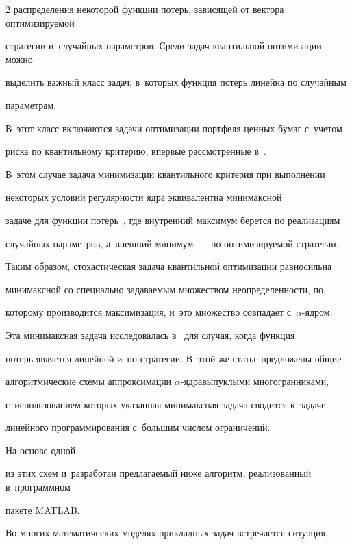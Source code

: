 \begin{multicols}{2}
распределения некоторой функции потерь, зависящей от вектора оптимизируемой 

стратегии и~случайных па\-ра\-мет\-ров. Среди задач квантильной оптимизации можно

 выделить важный класс задач, в~которых функция потерь линейна по случайным 

 па\-ра\-мет\-рам.

В~этот класс включаются задачи оптимизации портфеля ценных бумаг с~учетом 

риска по квантильному критерию, впервые рас\-смот\-рен\-ные в~\cite{moeseke}.

В~этом случае задача минимизации квантильного критерия при выполнении 

некоторых условий регулярности ядра эквивалентна минимаксной 

задаче для функции потерь~\cite{kankibzun}, где внут\-рен\-ний максимум берется по реализациям 

случайных па\-ра\-мет\-ров, а~внеш\-ний минимум~--- по оптимизируемой стратегии. 



Таким образом, сто\-ха\-сти\-че\-ская задача квантильной оптимизации равносильна 

минимаксной со специально за\-да\-ва\-емым множеством неопределенности, по 

которому производится максимизация, и~это множество совпадает с~$\alpha$-яд\-ром. 



Эта минимаксная задача исследовалась в~\cite{vaskan} для случая, когда функция 

потерь является линейной и~по стратегии. В~этой же статье предложены общие 

алгоритмические схемы аппроксимации $\alpha$-яд\-ра\linebreak выпуклы\-ми многогранниками, 

с~использованием которых указанная минимаксная задача сводится к~задаче 

линейного программирования с~большим чис\-лом ограничений. 

%

На основе одной 

из этих схем и~разработан пред\-ла\-га\-емый ниже алгоритм, реализованный в~программном 

пакете MATLAB.



Во многих математических моделях прикладных задач встречается ситуация, 


\end{multicols}
